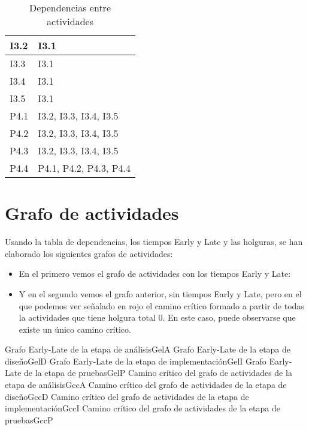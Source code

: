 \documentclass[11pt,a4paper,spanish,twoside]{report}
\begin{document}
\begin{table}[!h]
\begin{tabular}{l|l}
    \hline
    I3.2   & I3.1                     \\
    \hline
    I3.3   & I3.1                     \\
    \hline
    I3.4   & I3.1                     \\
    \hline
    I3.5   & I3.1                     \\
    \hline
    P4.1   & I3.2, I3.3, I3.4, I3.5   \\
    \hline
    P4.2   & I3.2, I3.3, I3.4, I3.5   \\
    \hline
    P4.3   & I3.2, I3.3, I3.4, I3.5   \\
    \hline
    P4.4   & P4.1, P4.2, P4.3, P4.4   \\
    \hline
    
  \end{tabular}
  \caption{Dependencias entre actividades} \label{Tab:tabdep}
\end{table}

\section{Grafo de actividades}
Usando la tabla de dependencias, los tiempos Early y Late y las holguras, se 
han elaborado los siguientes grafos de actividades:

\begin{itemize}
\item En el primero vemos el grafo de actividades con los tiempos Early y Late:
\item Y en el segundo vemos el grafo anterior, sin tiempos Early y Late, 
pero en el que podemos ver señalado en rojo el camino crítico formado a
partir de todas la actividades que tiene holgura total 0. En este caso, puede 
observarse que existe un único camino crítico.
\end{itemize}

{Grafo Early-Late de la etapa de análisis}{GelA}
{Grafo Early-Late de la etapa de diseño}{GelD}
{Grafo Early-Late de la etapa de implementación}{GelI}
{Grafo Early-Late de la etapa de pruebas}{GelP}
{Camino crítico del grafo de actividades de la etapa de análisis}{GccA}
{Camino crítico del grafo de actividades de la etapa de diseño}{GccD}
{Camino crítico del grafo de actividades de la etapa de implementación}{GccI}
{Camino crítico del grafo de actividades de la etapa de pruebas}{GccP}

 

\end{document}
